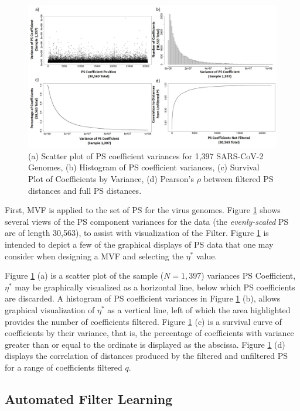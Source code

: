 \documentclass[10pt,conference]{IEEEtran}
\begin{document}
\begin{figure}[h!] 
\caption{(a) Scatter plot of PS coefficient variances for 1,397 SARS-CoV-2 Genomes, (b) Histogram of PS coefficient variances, (c) Survival Plot of Coefficients by Variance, (d) Pearson's $\rho$ between filtered PS distances and full PS distances. \label{fig:coeffvar}} 
\vspace{0.5 em}
\centering
\includegraphics[scale=0.27]{Images/Files/VarianceFiltCombined.jpg}
\end{figure}

\noindent First, MVF is applied to the set of PS for the virus genomes. 
Figure \ref{fig:coeffvar} shows several views of the PS component variances for the data (the \textit{evenly-scaled} PS are of length 30,563), to assist with visualization of the Filter.
Figure \ref{fig:coeffvar} is intended to depict a few of the graphical displays of PS data that one may consider when designing a MVF and selecting the $\eta^*$ value. 


Figure \ref{fig:coeffvar} (a) is a scatter plot of the sample ($N=1,397$) variances PS Coefficient, $\eta^*$ may 
be graphically visualized as a horizontal line, below which PS coefficients are discarded. 
A histogram of PS coefficient variances in Figure \ref{fig:coeffvar} (b), allows graphical visualization of $\eta^*$ as a vertical line, left of which the area highlighted  provides the number of coefficients filtered.  
Figure \ref{fig:coeffvar} (c) is a survival curve of coefficients by their variance, that is, the
percentage of coefficients with variance greater than or equal to the ordinate is displayed as the 
abscissa. 
Figure \ref{fig:coeffvar} (d) displays the correlation of distances produced by the filtered and unfiltered PS for a range of coefficients filtered $q$. 


\subsection{Automated Filter Learning}
\end{document}
